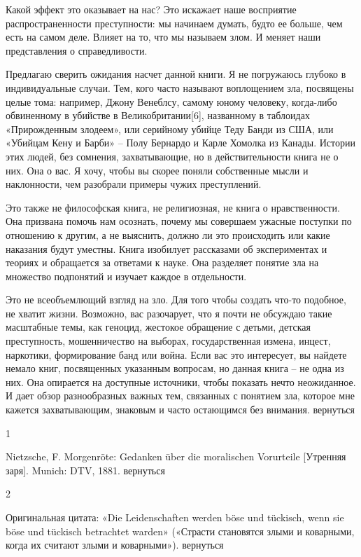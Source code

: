 Какой эффект это оказывает на нас? Это искажает наше восприятие распространенности преступности: мы начинаем думать, будто ее больше, чем есть на самом деле. Влияет на то, что мы называем злом. И меняет наши представления о справедливости.

Предлагаю сверить ожидания насчет данной книги. Я не погружаюсь глубоко в индивидуальные случаи. Тем, кого часто называют воплощением зла, посвящены целые тома: например, Джону Венеблсу, самому юному человеку, когда-либо обвиненному в убийстве в Великобритании[6], названному в таблоидах «Прирожденным злодеем», или серийному убийце Теду Банди из США, или «Убийцам Кену и Барби» – Полу Бернардо и Карле Хомолка из Канады. Истории этих людей, без сомнения, захватывающие, но в действительности книга не о них. Она о вас. Я хочу, чтобы вы скорее поняли собственные мысли и наклонности, чем разобрали примеры чужих преступлений.

Это также не философская книга, не религиозная, не книга о нравственности. Она призвана помочь нам осознать, почему мы совершаем ужасные поступки по отношению к другим, а не выяснить, должно ли это происходить или какие наказания будут уместны. Книга изобилует рассказами об экспериментах и теориях и обращается за ответами к науке. Она разделяет понятие зла на множество подпонятий и изучает каждое в отдельности.
	
	

Это не всеобъемлющий взгляд на зло. Для того чтобы создать что-то подобное, не хватит жизни. Возможно, вас разочарует, что я почти не обсуждаю такие масштабные темы, как геноцид, жестокое обращение с детьми, детская преступность, мошенничество на выборах, государственная измена, инцест, наркотики, формирование банд или война. Если вас это интересует, вы найдете немало книг, посвященных указанным вопросам, но данная книга – не одна из них. Она опирается на доступные источники, чтобы показать нечто неожиданное. И дает обзор разнообразных важных тем, связанных с понятием зла, которое мне кажется захватывающим, знаковым и часто остающимся без внимания.
вернуться

1

Nietzsche, F. Morgenröte: Gedanken über die moralischen Vorurteile [Утренняя заря]. Munich: DTV, 1881.
вернуться

2

Оригинальная цитата: «Die Leidenschaften werden böse und tückisch, wenn sie böse und tückisch betrachtet warden» («Страсти становятся злыми и коварными, когда их считают злыми и коварными»).
вернуться

